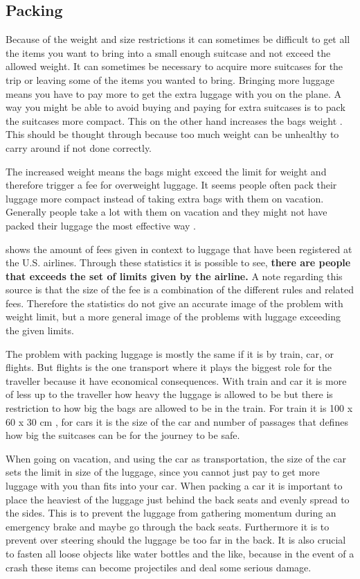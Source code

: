\subsection*{Packing}

Because of the weight and size restrictions it can sometimes be difficult to get all the items you want to bring into a small enough suitcase and not exceed the allowed weight. It can sometimes be necessary to acquire more suitcases for the trip or leaving some of the items you wanted to bring. 
Bringing more luggage means you have to pay more to get the extra luggage with you on the plane. A way you might be able to avoid buying and paying for extra suitcases is to pack the suitcases more compact. This on the other hand increases the bags weight \citep{altombag}. This should be thought through because too much weight can be unhealthy to carry around if not done correctly. 

The increased weight means the bags might exceed the limit for weight and therefore trigger a fee for overweight luggage.
It seems people often pack their luggage more compact instead of taking extra bags with them on vacation. Generally people take a lot with them on vacation and they might not have packed their luggage the most effective way \citep{airstat}.

\citep{airstat} shows the amount of fees given in context to luggage that have been registered at the U.S. airlines. Through these statistics it is possible to see, \textbf{there are people that exceeds the set of limits given by the airline.} A note regarding this source is that the size of the fee is a combination of the different rules and related fees. Therefore the statistics do not give an accurate image of the problem with weight limit, but a more general image of the problems with luggage exceeding the given limits.

The problem with packing luggage is mostly the same if it is by train, car, or flights. But flights is the one transport where it plays the biggest role for the traveller because it have economical consequences. With train and car it is more of less up to the traveller how heavy the luggage is allowed to be but there is restriction to how big the bags are allowed to be in the train. For train it is 100 x 60 x 30 cm \citep{rulestrain}, for cars it is the size of the car and number of passages that defines how big the suitcases can be for the journey to be safe.

When going on vacation, and using the car as transportation, the size of the car sets the limit in size of the luggage, since you cannot just pay to get more luggage with you than fits into your car. When packing a car it is important to place the heaviest of the luggage just behind the back seats and evenly spread to the sides. This is to prevent the luggage from gathering momentum during an emergency brake and maybe go through the back seats. Furthermore it is to prevent over steering should the luggage be too far in the back. It is also crucial to fasten all loose objects like water bottles and the like, because in the event of a crash these items can become projectiles and deal some serious damage\citep{Farlig_bagage}.

